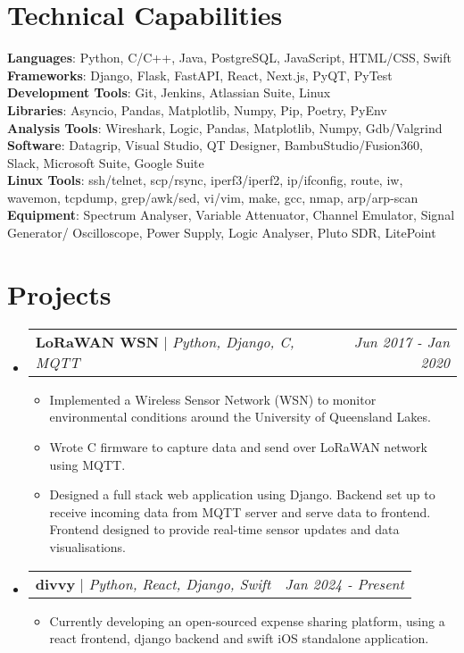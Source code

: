 \documentclass[a4paper,11pt]{article}
\makeatletter
\newcommand{\resumeItem}[1]{
  \item\small{
    {#1 \vspace{-2pt}}
  }
}
\newcommand{\resumeProjectHeading}[2]{
    \item
    \begin{tabular*}{0.97\textwidth}{l@{\extracolsep{\fill}}r}
      \small#1 & \textit{\small #2} \\
    \end{tabular*}\vspace{-7pt}
}
\newcommand{\resumeSubHeadingListStart}{\begin{itemize}[leftmargin=0.15in, label={}]}
\newcommand{\resumeSubHeadingListEnd}{\end{itemize}}
\newcommand{\resumeItemListStart}{\begin{itemize}}
\newcommand{\resumeItemListEnd}{\end{itemize}\vspace{-5pt}}
\makeatother
\begin{document}
\section{Technical Capabilities}
 \begin{itemize}[leftmargin=0.15in, label={}]
    \small{\item{
     \textbf{Languages}{: Python, C/C++, Java, PostgreSQL, JavaScript, HTML/CSS, Swift} \\
     \textbf{Frameworks}{: Django, Flask, FastAPI, React, Next.js, PyQT, PyTest} \\
     \textbf{Development Tools}{: Git, Jenkins, Atlassian Suite, Linux} \\
     \textbf{Libraries}{: Asyncio, Pandas, Matplotlib, Numpy, Pip, Poetry, PyEnv} \\
     \textbf{Analysis Tools}{: Wireshark, Logic, Pandas, Matplotlib, Numpy, Gdb/Valgrind} \\
     \textbf{Software}{: Datagrip, Visual Studio, QT Designer, BambuStudio/Fusion360, Slack, Microsoft Suite, Google Suite} \\
     \textbf{Linux Tools}{: ssh/telnet, scp/rsync, iperf3/iperf2, ip/ifconfig, route, iw, wavemon, tcpdump, grep/awk/sed, vi/vim, make, gcc, nmap, arp/arp-scan} \\
     \textbf{Equipment}{: Spectrum Analyser, Variable Attenuator, Channel Emulator, Signal Generator/ Oscilloscope, Power Supply, Logic Analyser, Pluto SDR, LitePoint} \\
    }}
 \end{itemize}

\section{Projects}
    \resumeSubHeadingListStart
      \resumeProjectHeading
          {\textbf{LoRaWAN WSN} $|$ \emph{Python, Django, C, MQTT}}{Jun 2017 - Jan 2020}
          \resumeItemListStart
            \resumeItem{Implemented a Wireless Sensor Network (WSN) to monitor environmental conditions around the University of Queensland Lakes.}
            \resumeItem{Wrote C firmware to capture data and send over LoRaWAN network using MQTT.}
            \resumeItem{Designed a full stack web application using Django. Backend set up to receive incoming data from MQTT server and serve data to frontend. Frontend designed to provide real-time sensor updates and data visualisations.}
          \resumeItemListEnd
      \resumeProjectHeading
          {\textbf{divvy} $|$ \emph{Python, React, Django, Swift}}{Jan 2024 - Present}
          \resumeItemListStart
            \resumeItem{Currently developing an open-sourced expense sharing platform, using a react frontend, django backend and swift iOS standalone application.}
          \resumeItemListEnd
    \resumeSubHeadingListEnd






\end{document}
